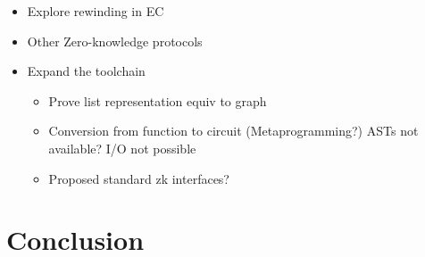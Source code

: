 \begin{itemize}
  \item Explore rewinding in EC
  \item Other Zero-knowledge protocols
  \item Expand the toolchain
    \begin{itemize}
      \item Prove list representation equiv to graph
      \item Conversion from function to circuit (Metaprogramming?) ASTs not available? I/O not possible
      \item Proposed standard zk interfaces?
    \end{itemize}
\end{itemize}


\section{Conclusion}
\label{sec:conclusion}


